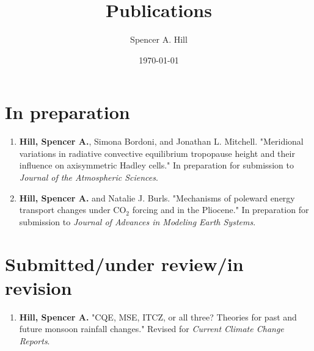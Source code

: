 \documentclass[12pt,letterpaper]{shillcv}
\author{Spencer A. Hill}
\date{\today}
\title{Publications}
\begin{document}
\maketitle


\section*{In preparation}
\label{sec:org4e47a42}
\begin{enumerate}
\item \textbf{Hill, Spencer A.}, Simona Bordoni, and Jonathan L. Mitchell.  "Meridional
variations in radiative convective equilibrium tropopause height and their
influence on axisymmetric Hadley cells."  In preparation for submission to
\emph{Journal of the Atmospheric Sciences}.
\item \textbf{Hill, Spencer A.} and Natalie J. Burls.  "Mechanisms of poleward energy
transport changes under CO\(_2\) forcing and in the Pliocene."  In
preparation for submission to \emph{Journal of Advances in Modeling Earth
Systems}.
\end{enumerate}
\section*{Submitted/under review/in revision}
\label{sec:org48577a6}
\begin{enumerate}
\item \textbf{Hill, Spencer A.} "CQE, MSE, ITCZ, or all three? Theories for past and
future monsoon rainfall changes."  Revised for \emph{Current Climate Change
Reports}.
\end{enumerate}
\end{document}
